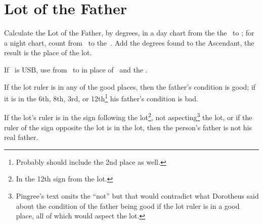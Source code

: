 \section{Lot of the Father}

Calculate the Lot of the Father, by degrees, in a day chart from the the \Sun\, to \Saturn; for a night chart, count from \Saturn\, to the \Sun\,. Add the degrees found to the Ascendant, the result is the place of the lot.

If \Saturn\, is USB, use from \Mars\, to \Jupiter in place of \Saturn\, and the \Sun.

If the lot ruler is in any of the good places, then the father's condition is good; if it is in the 6th, 8th, 3rd, or 12th\footnote{Probably should include the 2nd place as well.} his father's condition is bad.

If the lot's ruler is in the sign following the lot\footnote{In the 12th sign from the lot.}, not aspecting\footnote{Pingree's text omits the ``not'' but that would contradict what Dorotheus said about the condition of the father being good if the lot ruler is in a good place, all of which would aspect the lot.} the lot, or if the ruler of the sign opposite the lot is in the lot, then the person's father is not his real father.

